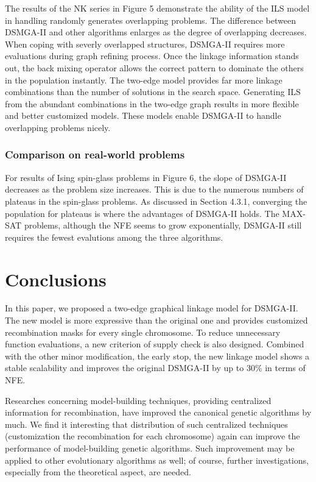 \documentclass{sig-alternate-05-2015}
\begin{document}
The results of the NK series in Figure 5 demonstrate the ability of the ILS model in handling randomly generates overlapping problems. 
The difference between DSMGA-II and other algorithms enlarges as the degree of overlapping decreases. 
When coping with severly overlapped structures, DSMGA-II requires more evaluations during graph refining process.
Once the linkage information stands out, the back mixing operator allows the correct pattern to dominate the others in the population instantly. 
The two-edge model provides far more linkage combinations than the number of solutions in the search space.
Generating ILS from the abundant combinations in the two-edge graph results in more flexible and better customized models.
These models enable DSMGA-II to handle overlapping problems nicely. 


\subsubsection{ Comparison on real-world problems }



For results of Ising spin-glass problems in Figure 6, the slope of DSMGA-II decreases as the problem size increases. 
This is due to the numerous numbers of plateaus in the spin-glass problems.
As discussed in Section 4.3.1, converging the population for plateaus is where the advantages of DSMGA-II holds.
The MAX-SAT problems, although the NFE seems to grow exponentially, DSMGA-II still requires the fewest evalutions among the three algorithms.



\section{Conclusions}
 
In this paper, we proposed a two-edge graphical linkage model for DSMGA-II. 
The new model is more expressive than the original one and provides customized recombination masks for every single chromosome. 
To reduce unnecessary function evaluations, a new criterion of supply check  is also designed. Combined with the other minor modification, the early stop, the new linkage model shows a stable scalability and improves the original DSMGA-II by up to 30\% in terms of NFE.



Researches concerning model-building techniques, providing centralized information for recombination, have improved the canonical genetic algorithms by much. 
We find it interesting that distribution of such centralized techniques (customization the recombination for each chromosome) again can improve the performance of model-building genetic algorithms. 
Such improvement may be applied to other evolutionary algorithms as well; of course,  further investigations, especially from the theoretical aspect, are needed.  
\end{document}
